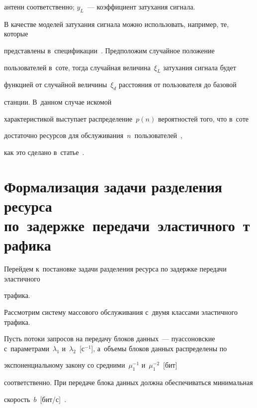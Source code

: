 антенн соответственно; $y_L$~--- коэффициент затухания сигнала.





В качестве моделей затухания сигнала можно использовать, например, те, которые 


представлены в~спецификации~\cite{3GPP38901}. Предположим случайное положение 


пользователей в~соте, тогда случайная величина~$\xi_L$ затухания сигнала будет 


функцией от случайной величины~$\xi_d$ расстояния от пользователя до базовой 


станции. В~данном случае искомой


характеристикой выступает распределение~$p(n)$ вероятностей того, что в~соте 


достаточно ресурсов для обслуживания~$n$~пользователей~\cite{Moltchanov2022}, 


как это сделано в~статье~\cite{Kochetkova2021b}.











\section{Формализация задачи разделения ресурса по~задержке~передачи~эластичного~трафика} 


\label{sec4}








Перейдем к~постановке задачи разделения ресурса по задержке передачи эластичного 


трафика.


Рассмотрим систему массового обслуживания с~двумя классами эластичного трафика.


Пусть потоки запросов на передачу блоков данных~--- пуассоновские с~параметрами~$\lambda_1$ и~$\lambda_2$~[с$^{-1}$], а~объемы блоков данных распределены по 


экспоненциальному закону со средними~$\mu_1^{-1}$ и~$\mu_1^{-2}$~[бит] 


соответственно. При передаче блока данных должна обеспечиваться минимальная 


ско\-рость~$b$~[бит\!/\!с]~\cite{Vlaskina2022}.





